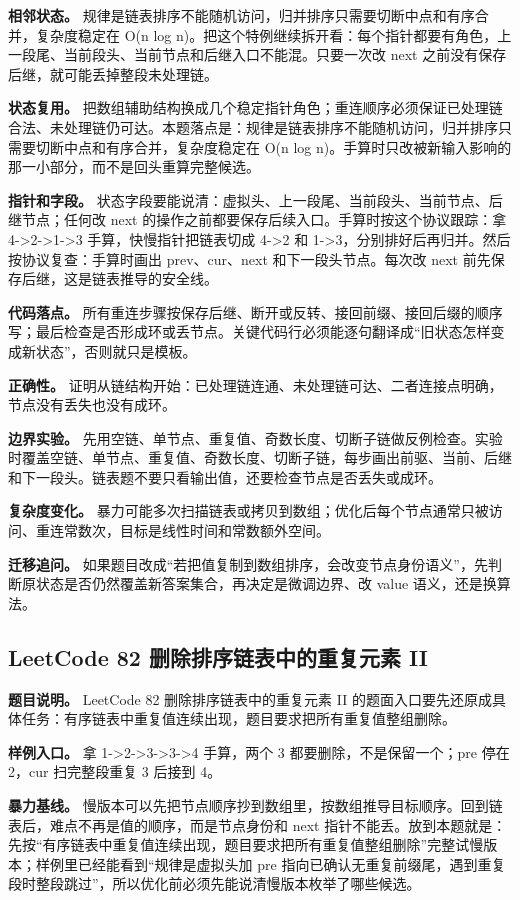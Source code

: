\textbf{相邻状态。} 规律是链表排序不能随机访问，归并排序只需要切断中点和有序合并，复杂度稳定在 O(n log n)。把这个特例继续拆开看：每个指针都要有角色，上一段尾、当前段头、当前节点和后继入口不能混。只要一次改 next 之前没有保存后继，就可能丢掉整段未处理链。

\textbf{状态复用。} 把数组辅助结构换成几个稳定指针角色；重连顺序必须保证已处理链合法、未处理链仍可达。本题落点是：规律是链表排序不能随机访问，归并排序只需要切断中点和有序合并，复杂度稳定在 O(n log n)。手算时只改被新输入影响的那一小部分，而不是回头重算完整候选。

\textbf{指针和字段。} 状态字段要能说清：虚拟头、上一段尾、当前段头、当前节点、后继节点；任何改 next 的操作之前都要保存后续入口。手算时按这个协议跟踪：拿 4->2->1->3 手算，快慢指针把链表切成 4->2 和 1->3，分别排好后再归并。然后按协议复查：手算时画出 prev、cur、next 和下一段头节点。每次改 next 前先保存后继，这是链表推导的安全线。

\textbf{代码落点。} 所有重连步骤按保存后继、断开或反转、接回前缀、接回后缀的顺序写；最后检查是否形成环或丢节点。关键代码行必须能逐句翻译成“旧状态怎样变成新状态”，否则就只是模板。

\textbf{正确性。} 证明从链结构开始：已处理链连通、未处理链可达、二者连接点明确，节点没有丢失也没有成环。

\textbf{边界实验。} 先用空链、单节点、重复值、奇数长度、切断子链做反例检查。实验时覆盖空链、单节点、重复值、奇数长度、切断子链，每步画出前驱、当前、后继和下一段头。链表题不要只看输出值，还要检查节点是否丢失或成环。

\textbf{复杂度变化。} 暴力可能多次扫描链表或拷贝到数组；优化后每个节点通常只被访问、重连常数次，目标是线性时间和常数额外空间。

\textbf{迁移追问。} 如果题目改成“若把值复制到数组排序，会改变节点身份语义”，先判断原状态是否仍然覆盖新答案集合，再决定是微调边界、改 value 语义，还是换算法。

\subsection{LeetCode 82 删除排序链表中的重复元素 II}

\textbf{题目说明。} LeetCode 82 删除排序链表中的重复元素 II 的题面入口要先还原成具体任务：有序链表中重复值连续出现，题目要求把所有重复值整组删除。

\textbf{样例入口。} 拿 1->2->3->3->4 手算，两个 3 都要删除，不是保留一个；pre 停在 2，cur 扫完整段重复 3 后接到 4。

\textbf{暴力基线。} 慢版本可以先把节点顺序抄到数组里，按数组推导目标顺序。回到链表后，难点不再是值的顺序，而是节点身份和 next 指针不能丢。放到本题就是：先按“有序链表中重复值连续出现，题目要求把所有重复值整组删除”完整试慢版本；样例里已经能看到“规律是虚拟头加 pre 指向已确认无重复前缀尾，遇到重复段时整段跳过”，所以优化前必须先能说清慢版本枚举了哪些候选。

